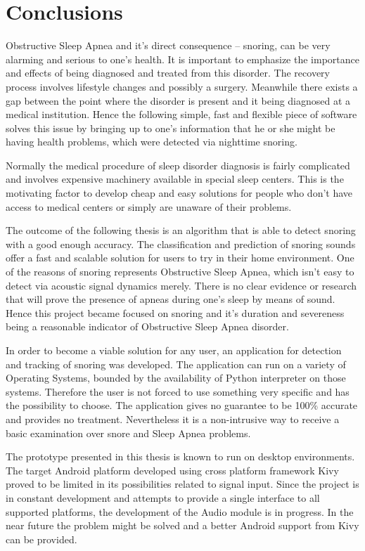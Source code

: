 \section*{Conclusions}

Obstructive Sleep Apnea and it's direct consequence -- snoring, can be very alarming and serious to one's health. It is important to emphasize the importance and effects of being diagnosed and treated from this disorder. The recovery process involves lifestyle changes and possibly a surgery. Meanwhile there exists a gap between the point where the disorder is present and it being diagnosed at a medical institution. Hence the following simple, fast and flexible piece of software solves this issue by bringing up to one's information that he or she might be having health problems, which were detected via nighttime snoring.

Normally the medical procedure of sleep disorder diagnosis is fairly complicated and involves expensive machinery available in special sleep centers. This is the motivating factor to develop cheap and easy solutions for people who don't have access to medical centers or simply are unaware of their problems.

The outcome of the following thesis is an algorithm that is able to detect snoring with a good enough accuracy. The classification and prediction of snoring sounds offer a fast and scalable solution for users to try in their home environment. One of the reasons of snoring represents Obstructive Sleep Apnea, which isn't easy to detect via acoustic signal dynamics merely. There is no clear evidence or research that will prove the presence of apneas during one's sleep by means of sound. Hence this project became focused on snoring and it's duration and severeness being a reasonable indicator of Obstructive Sleep Apnea disorder. 

In order to become a viable solution for any user, an application for detection and tracking of snoring was developed. The application can run on a variety of Operating Systems, bounded by the availability of Python interpreter on those systems. Therefore the user is not forced to use something very specific and has the possibility to choose. The application gives no guarantee to be 100\% accurate and provides no treatment. Nevertheless it is a non-intrusive way to receive a basic examination over snore and Sleep Apnea problems.

The prototype presented in this thesis is known to run on desktop environments. The target Android platform developed using cross platform framework Kivy proved to be limited in its possibilities related to signal input. Since the project is in constant development and attempts to provide a single interface to all supported platforms, the development of the Audio module is in progress. In the near future the problem might be solved and a better Android support from Kivy can be provided. 

